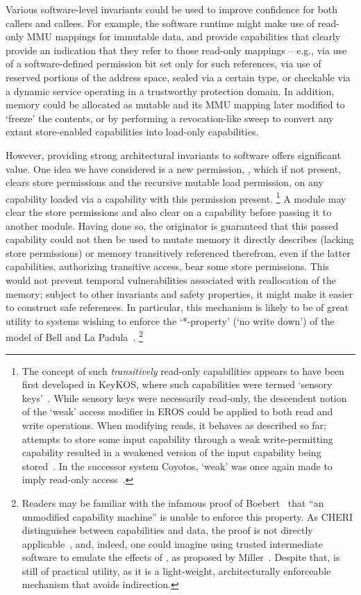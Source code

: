 Various software-level invariants could be used to improve confidence for both
callers and callees.
For example, the software runtime might make use of read-only MMU mappings for
immutable data, and provide capabilities that clearly provide an indication
that they refer to those read-only mappings -- e.g., via use of a
software-defined permission bit set only for such references, via use of
reserved portions of the address space, sealed via a certain type, or
checkable via a dynamic service operating in a trustworthy protection domain.
In addition, memory could be allocated as mutable and its MMU mapping later
modified to `freeze' the contents, or by performing a revocation-like sweep
to convert any extant store-enabled capabilities into load-only capabilities.

However, providing strong architectural invariants to software offers
significant value.  One idea we have considered is a new permission,
\cappermRML, which if not present, clears store
permissions and the recursive mutable load permission, on any capability
loaded via a capability with this permission present.%
%
\footnote{The concept of such \emph{transitively} read-only capabilities
appears to have been first developed in KeyKOS, where such capabilities were
termed `sensory keys'~\cite{hardy:keykos}.  While sensory keys were
necessarily read-only, the descendent notion of the `weak' access modifier
in EROS could be applied to both read and write operations.  When modifying
reads, it behaves as described so far; attempts to store some input
capability through a weak write-permitting capability resulted in a
weakened version of the input capability being stored~\cite{shapiro:eros}.
In the successor system Coyotos, `weak' was once again made to imply
read-only access~\cite{doerrie2015:confinement,shapiro:coyotosspec}.}
%
A module may clear the store permissions and also clear
\cappermRML on a capability before passing it to another
module.  Having done so, the originator is guaranteed that this passed
capability could not then be used to mutate memory it directly describes
(lacking store permissions) or memory transitively referenced therefrom, even
if the latter capabilities, authorizing transitive access, bear some store
permissions.
%
This would not prevent temporal vulnerabilities
associated with reallocation of the memory; subject to other invariants
and safety properties, it might make it easier to construct safe references.
In particular, this mechanism is likely to be of great utility to systems
wishing to enforce the `*-property' (`no write down') of the model of
Bell and La Padula~\cite{B+LP76}.%
%
\footnote{Readers may be familiar with the infamous proof of
Boebert~\cite{boebert:inabilitystar} that ``an unmodified capability machine''
is unable to enforce this property.  As CHERI distinguishes between
capabilities and data, the proof is not directly
applicable~\cite{miller:capmyths}, and, indeed, one could imagine using trusted
intermediate software to emulate the effects of
\cappermRML, as proposed by
Miller~\cite{miller:paradigmregained}.  Despite that,
\cappermRML is still of practical utility, as it is a
light-weight, architecturally enforceable mechanism that avoids indirection.}

